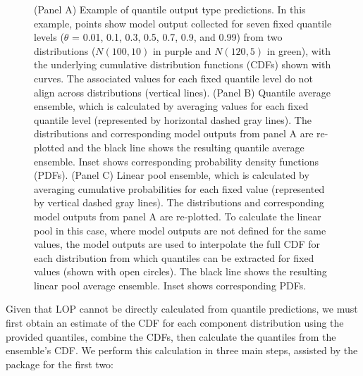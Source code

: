 \documentclass[
  article,
  shortnames,
  notitle]{jss}
\begin{document}
\begin{figure}


\caption{\label{fig-example-quantile-average-and-linear-pool}(Panel A)
Example of quantile output type predictions. In this example, points
show model output collected for seven fixed quantile levels (\(\theta\)
= 0.01, 0.1, 0.3, 0.5, 0.7, 0.9, and 0.99) from two distributions
(\(N(100, 10)\) in purple and \(N(120, 5)\) in green), with the
underlying cumulative distribution functions (CDFs) shown with curves.
The associated values for each fixed quantile level do not align across
distributions (vertical lines). (Panel B) Quantile average ensemble,
which is calculated by averaging values for each fixed quantile level
(represented by horizontal dashed gray lines). The distributions and
corresponding model outputs from panel A are re-plotted and the black
line shows the resulting quantile average ensemble. Inset shows
corresponding probability density functions (PDFs). (Panel C) Linear
pool ensemble, which is calculated by averaging cumulative probabilities
for each fixed value (represented by vertical dashed gray lines). The
distributions and corresponding model outputs from panel A are
re-plotted. To calculate the linear pool in this case, where model
outputs are not defined for the same values, the model outputs are used
to interpolate the full CDF for each distribution from which quantiles
can be extracted for fixed values (shown with open circles). The black
line shows the resulting linear pool average ensemble. Inset shows
corresponding PDFs.}

\end{figure}%

Given that LOP cannot be directly calculated from quantile predictions,
we must first obtain an estimate of the CDF for each component
distribution using the provided quantiles, combine the CDFs, then
calculate the quantiles from the ensemble's CDF. We perform this
calculation in three main steps, assisted by the  package
\citep{distfromq} for the first two:
\end{document}
